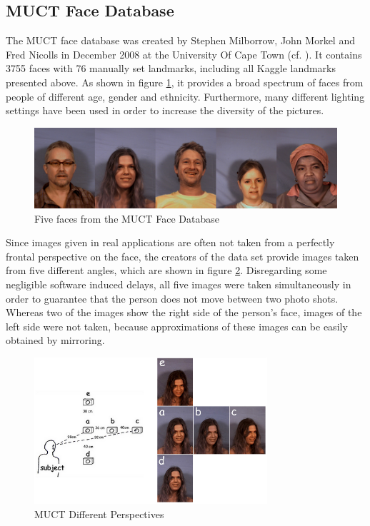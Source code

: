 \documentclass[11pt, a4paper]{article}
\begin{document}
\subsection{MUCT Face Database}

The \acf{MUCT} face database was created by Stephen Milborrow, John Morkel and Fred Nicolls in December 2008 at the University Of Cape Town (cf. \cite{muct}). It contains 3755 faces with 76 manually set landmarks, including all Kaggle landmarks presented above. As shown in figure \ref{fig:muctfaces}, it provides a broad spectrum of faces from people of different age, gender and ethnicity. Furthermore, many different lighting settings have been used in order to increase the diversity of the pictures.

\begin{figure}[htbp]
	\centering
	\includegraphics[width=\textwidth]{muct_faces.png}
	\caption{Five faces from the MUCT Face Database}
	\label{fig:muctfaces}
\end{figure}

Since images given in real applications are often not taken from a perfectly frontal perspective on the face, the creators of the data set provide images taken from five different angles, which are shown in figure \ref{fig:muctangles}. Disregarding some negligible software induced delays, all five images were taken simultaneously in order to guarantee that the person does not move between two photo shots. Whereas two of the images show the right side of the person's face, images of the left side were not taken, because approximations of these images can be easily obtained by mirroring.

\begin{figure}[htbp]
	\centering
	\includegraphics[width=0.77\textwidth]{muct_perspectives.png}
	\caption[MUCT Different Perspectives]{MUCT Different Perspectives\footnotemark}
	\label{fig:muctangles}
\end{figure}
\end{document}
